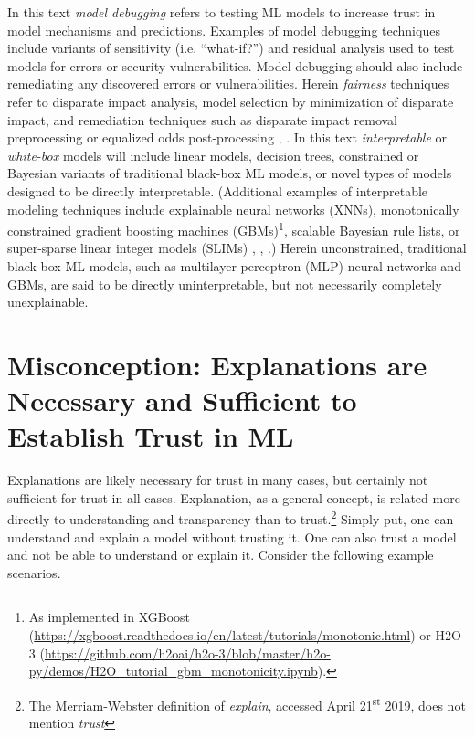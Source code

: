 \documentclass[fleqn]{article}
\begin{document}
\noindent In this text \textit{model debugging} refers to testing ML models to increase trust in model mechanisms and predictions. Examples of model debugging techniques include variants of sensitivity (i.e. ``what-if?'') and residual analysis used to test models for errors or security vulnerabilities. Model debugging should also include remediating any discovered errors or vulnerabilities. Herein \textit{fairness} techniques refer to disparate impact analysis, model selection by minimization of disparate impact, and remediation techniques such as disparate impact removal preprocessing or equalized odds post-processing \cite{feldman2015certifying}, \cite{hardt2016equality}. In this text \textit{interpretable} or \textit{white-box} models will include linear models, decision trees, constrained or Bayesian variants of traditional black-box ML models, or novel types of models designed to be directly interpretable. (Additional examples of interpretable modeling techniques include explainable neural networks (XNNs), monotonically constrained gradient boosting machines (GBMs)\footnote{As implemented in XGBoost (\url{https://xgboost.readthedocs.io/en/latest/tutorials/monotonic.html}) or H2O-3 (\url{https://github.com/h2oai/h2o-3/blob/master/h2o-py/demos/H2O_tutorial_gbm_monotonicity.ipynb}).}, scalable Bayesian rule lists, or super-sparse linear integer models (SLIMs) \cite{wf_xnn}, \cite{sbrl}, \cite{slim}.) Herein unconstrained, traditional black-box ML models, such as multilayer perceptron (MLP) neural networks and GBMs, are said to be directly uninterpretable, but not necessarily completely unexplainable.

\section{Misconception: Explanations are Necessary and Sufficient to Establish Trust in ML}

Explanations are likely necessary for trust in many cases, but certainly not sufficient for trust in all cases. 
Explanation, as a general concept, is related more directly to understanding and transparency than to trust.\footnote{The Merriam-Webster definition of \textit{explain}, accessed April 21\textsuperscript{st} 2019, does not mention \textit{trust}} Simply put, one can understand and explain a model without trusting it. One can also trust a model and not be able to understand or explain it. Consider the following example scenarios.
\end{document}
